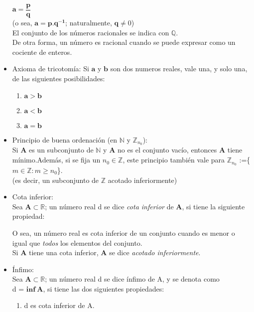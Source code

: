 \documentclass[a4paper,11pt]{report}
\begin{document}
\begin{itemize}
$\mathbf{a} = \dfrac{\mathbf{p}}{\mathbf{q}}$ \\
(o sea, $\mathbf{a} = \mathbf{p.q^{-1}}$; naturalmente, $\mathbf{q} \neq 0$) \\
El conjunto de los números racionales se indica con $\mathbb{Q}$. \\
De otra forma, un número es racional cuando se puede expresar como un cociente de enteros.\\
\item Axioma de tricotomía:
Si $\mathbf{a}$ y $\mathbf{b}$ son dos numeros reales, vale una, y solo una, de las siguientes posibilidades:
\begin{enumerate}
\item $\mathbf{a} > \mathbf{b}$
\item $\mathbf{a} < \mathbf{b}$
\item $\mathbf{a} = \mathbf{b}$
\end{enumerate}
\item Principio de buena ordenación (en $\mathbb{N}$ y  $\mathbb{Z}_{n_0}$): \\
Si $\mathbf{A}$ es un subconjunto de $\mathbb{N}$ y $\mathbf{A}$ no es el conjunto vacío, entonces $\mathbf{A}$ tiene mínimo.Además, si se fija un $n_0 \in \mathbb{Z}$, este principio también vale para $\mathbb{Z}_{n_0}$ :=\{$ m \in \mathbb{Z}: m \geqslant n_0$\}.\\
 (es decir, un subconjunto de $\mathbb{Z}$ acotado inferiormente)
\item Cota inferior: \\
Sea $\mathbf{A} \subset \mathbb{R}$; un número real d se dice \emph{cota inferior} de $\mathbf{A}$, si tiene la siguiente propiedad:
O sea, un número real es cota inferior de un conjunto cuando es
menor o igual que \emph{todos} los elementos del conjunto. \\
Si $\mathbf{A}$ tiene una cota inferior, $\mathbf{A}$ se dice \emph{acotado inferiormente}.
\item Ínfimo: \\
Sea $\mathbf{A} \subset \mathbb{R}$; un número real d se dice ínfimo de A, y se denota como \\ 
d = $\mathbf{inf\ A}$, si tiene las dos siguientes propiedades:
\begin{enumerate}
\item d es cota inferior de A.

\end{enumerate}
\end{itemize}
\end{document}
